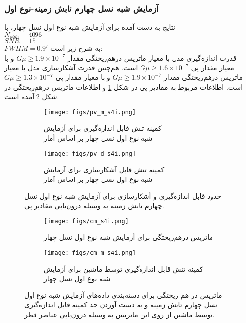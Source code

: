   	\subsubsection{آزمایش شبه نسل چهارم تابش زمینه-نوع اول} 
  	نتایج به دست آمده برای آزمایش شبه نوع اول نسل چهار، با\\
  	$N_{side} = 4096$ \\
  	$SNR=15$\\
   	$FWHM = 0.9'$
  	به شرح زیر است:\\
  	قدرت اندازه‌گیری مدل با معیار ماتریس در‌هم‌ریختگی مقدار 
  	$G\mu \geq 1.9\times 10^{-7}$
  	و با معیار مقدار پی 
  	$G\mu \geq 1.6\times 10^{-7}$
  	است. هم‌چنین قدرت آشکارسازی مدل با معیار ماتریس در‌هم‌ریختگی مقدار
  	$G\mu \geq 1.9\times 10^{-7}$
  	و با معیار مقدار پی 
  	$G\mu \geq 1.3\times 10^{-7}$
  	است. اطلاعات مربوط به مقادیر پی در شکل
  	\ref{fig:s4i_pv}
  	و اطلاعات ماتریس درهم‌ریختگی در شکل
  	\ref{fig:s4i_cm}
  	آمده است.
  	
  	
  	
  	\begin{figure}
  		\centering
  		\begin{subfigure}{0.5\textwidth}
  			\centering
  			\texttt{[image: figs/pv\_m\_s4i.png]}
  			\caption{   کمینه تنش قابل اندازه‌گیری برای آزمایش 
  				\\	 شبه نوع اول نسل چهار
  				بر اساس آمار }
  		\end{subfigure}%
  		\begin{subfigure}{0.5\textwidth}
  			\centering
  			\texttt{[image: figs/pv\_d\_s4i.png]}
  			\caption{  کمینه تنش قابل آشکارسازی برای آزمایش 
  				\\  شبه نوع اول نسل چهار
  				بر اساس آمار  }
  		\end{subfigure}
  		
  		\caption{حدود قابل اندازه‌گیری و آشکارسازی برای آزمایش 
شبه نوع اول نسل چهارم تابش زمینه به وسیله درون‌یابی مقادیر پی.}
  		\label{fig:s4i_pv}
  	\end{figure}
  	\begin{figure}
  		\centering
  		\begin{subfigure}{\textwidth}
  			\centering
  			\texttt{[image: figs/cm\_s4i.png]}
  			\caption{  ماتریس درهم‌ریختگی برای آزمایش 
  				شبه نوع اول نسل چهار }
  		\end{subfigure}%
  		
  		\begin{subfigure}{0.5\linewidth}
  			\centering
  			\texttt{[image: figs/cm\_m\_s4i.png]}
  			\caption{  کمینه تنش قابل اندازه‌گیری توسط ماشین برای آزمایش 
  				شبه نوع اول نسل چهار }
  		\end{subfigure}
  		
  		\caption{ماتریس در هم ریختگی برای دسته‌بندی داده‌های آزمایش
شبه نوع اول نسل چهارم تابش زمینه و به دست آوردن حد کمینه قابل اندازه‌گیری توسط ماشین از روی این ماتریس به وسیله درون‌یابی عناصر قطر.}
  		\label{fig:s4i_cm}
  	\end{figure}
  	
